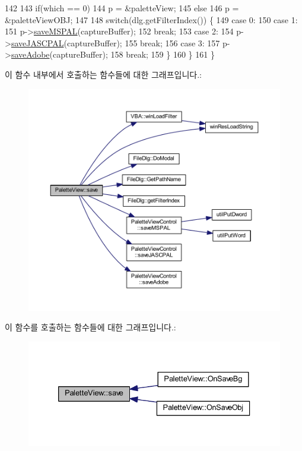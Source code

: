 \begin{DoxyCode}
142 
143     \textcolor{keywordflow}{if}(which == 0)
144       p = &paletteView;
145     \textcolor{keywordflow}{else}
146       p = &paletteViewOBJ;
147   
148     \textcolor{keywordflow}{switch}(dlg.getFilterIndex()) \{
149     \textcolor{keywordflow}{case} 0:
150     \textcolor{keywordflow}{case} 1:
151       p->\mbox{\hyperlink{class_palette_view_control_a0e2249bb157bf7fb36b128a83bf108b5}{saveMSPAL}}(captureBuffer);
152       \textcolor{keywordflow}{break};
153     \textcolor{keywordflow}{case} 2:
154       p->\mbox{\hyperlink{class_palette_view_control_a9efcff77eaf476013ac5f3ebd2d53779}{saveJASCPAL}}(captureBuffer);
155       \textcolor{keywordflow}{break};
156     \textcolor{keywordflow}{case} 3:
157       p->\mbox{\hyperlink{class_palette_view_control_a14d553a87d89463719adcaa63f42a72b}{saveAdobe}}(captureBuffer);
158       \textcolor{keywordflow}{break};
159     \}
160   \}
161 \}
\end{DoxyCode}
이 함수 내부에서 호출하는 함수들에 대한 그래프입니다.\+:
\nopagebreak
\begin{figure}[H]
\begin{center}
\leavevmode
\includegraphics[width=350pt]{class_palette_view_a107b71060221c9d44bdf0d38ca77c689_cgraph}
\end{center}
\end{figure}
이 함수를 호출하는 함수들에 대한 그래프입니다.\+:
\nopagebreak
\begin{figure}[H]
\begin{center}
\leavevmode
\includegraphics[width=333pt]{class_palette_view_a107b71060221c9d44bdf0d38ca77c689_icgraph}
\end{center}
\end{figure}
